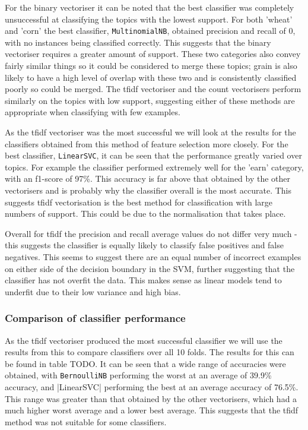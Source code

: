 \documentclass{article}
\begin{document}
For the binary vectoriser it can be noted that the best classifier was completely unsuccessful at classifying the topics with the lowest support. For both 'wheat' and 'corn' the best classifier, \verb|MultinomialNB|, obtained precision and recall of 0, with no instances being classified correctly. This suggests that the binary vectoriser requires a greater amount of support. These two categories also convey fairly similar things so it could be considered to merge these topics; grain is also likely to have a high level of overlap with these two and is consistently classified poorly so could be merged. The tfidf vectoriser and the count vectorisers perform similarly on the topics with low support, suggesting either of these methods are appropriate when classifying with few examples.

As the tfidf vectoriser was the most successful we will look at the results for the classifiers obtained from this method of feature selection more closely. For the best classifier, \verb|LinearSVC|, it can be seen that the performance greatly varied over topics. For example the classifier performed extremely well for the 'earn' category, with an f1-score of 97\%. This accuracy is far above that obtained by the other vectorisers and is probably why the classifier overall is the most accurate. This suggests tfidf vectorisation is the best method for classification with large numbers of support. This could be due to the normalisation that takes place. 

Overall for tfidf the precision and recall average values do not differ very much - this suggests the classifier is equally likely to classify false positives and false negatives. This seems to suggest there are an equal number of incorrect examples on either side of the decision boundary in the SVM, further suggesting that the classifier has not overfit the data. This makes sense as linear models tend to underfit due to their low variance and high bias.

\subsubsection{Comparison of classifier performance}
As the tfidf vectoriser produced the most successful classifier we will use the results from this to compare classifiers over all 10 folds. The results for this can be found in table TODO. It can be seen that a wide range of accuracies were obtained, with \verb|BernoulliNB| performing the worst at an average of 39.9\% accuracy, and |LinearSVC| performing the best at an average accuracy of 76.5\%. This range was greater than that obtained by the other vectorisers, which had a much higher worst average and a lower best average. This suggests that the tfidf method was not suitable for some classifiers.
\end{document}
